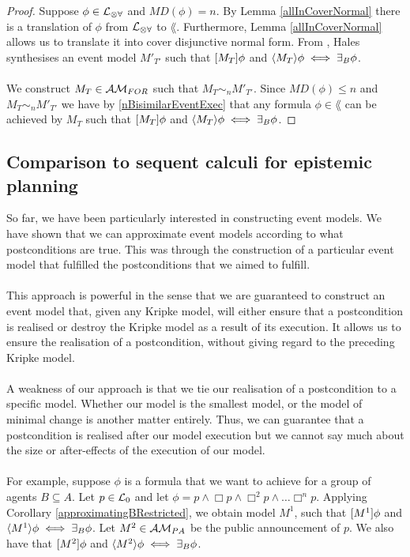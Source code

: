 \begin{proof}
Suppose $\phi \in \mathcal{L}_{\otimes\forall}$ and $MD(\phi) = n$.
By Lemma \ref{allInCoverNormal} there is a translation of $\phi$ from $\mathcal{L}_{\otimes\forall}$ to $\lang$.
Furthermore, Lemma \ref{allInCoverNormal} allows us to translate it into cover disjunctive normal form.
From \cite{hales13synthesis}, Hales synthesises an event model $M'_{T'}$ such that $[{M_T}] \phi$ and $\langle {M_T} \rangle
\phi \iff \exists_B \phi$.\\
\\
We construct $M_T \in \mathcal{AM}_{FOR}$ such that $M_T \sim_n M'_{T'}$.
Since $MD(\phi) \leq n$ and $M_T \sim_n M'_{T'}$ we have by \ref{nBisimilarEventExec} that any
formula $\phi \in \lang$ can be achieved by $M_T$ such that $[{M_T}] \phi$ and $\langle {M_T} \rangle \phi
\iff \exists_B \phi$.
\end{proof}

\subsection{Comparison to sequent calculi for epistemic planning}

So far, we have been particularly interested in constructing event models.
We have shown that we can approximate event models according to what
postconditions are true.
This was through the construction of a particular event model that fulfilled
the postconditions that we aimed to fulfill.\\
\\
This approach is powerful in the sense that we are guaranteed to construct an event model
that, given any Kripke model, will either ensure that a postcondition
is realised or destroy the Kripke model as a result of its execution.
It allows us to ensure the realisation of a postcondition, without giving
regard to the preceding Kripke model.\\
\\
A weakness of our approach is that we tie our realisation of a postcondition to a specific model.
Whether our model is the smallest model, or the model of minimal change is another matter entirely.
Thus, we can guarantee that a postcondition is realised after our model
execution but we cannot say much about the size or after-effects of the
execution of our model.\\
\\
For example, suppose $\phi$ is a formula that we want to achieve for a group of agents $B \subseteq
A$.
Let $p \in \mathcal{L}_0$ and let $\phi = p \land \Box p \land \Box^2 p \land \ldots \Box^n p$.
Applying Corollary \ref{approximatingBRestricted}, we obtain model $M^1$, such that $[{M^1}]\phi$
and $\langle {M^1} \rangle\phi \iff \exists_B \phi$.
Let $M^2 \in \mathcal{AM}_{PA}$ be the public announcement of $p$.
We also have that $[{M^2}] \phi$ and $\langle {M^2} \rangle \phi \iff \exists_B \phi$.


